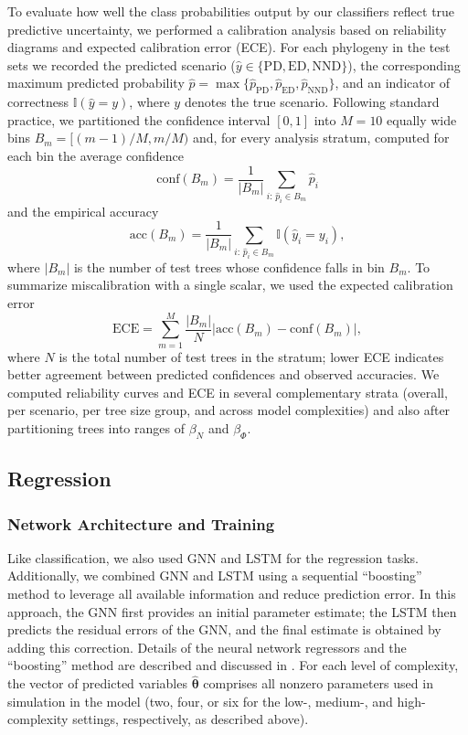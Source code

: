 {To evaluate how well the class probabilities output by our classifiers reflect true predictive uncertainty, we performed a calibration analysis based on reliability diagrams and expected calibration error (ECE). For each phylogeny in the test sets we recorded the predicted scenario (\(\widehat{y}\in\{\mathrm{PD}, \mathrm{ED}, \mathrm{NND}\}\)), the corresponding maximum predicted probability \(\hat{p}=\max\{\hat{p}_{\mathrm{PD}},\hat{p}_{\mathrm{ED}},\hat{p}_{\mathrm{NND}}\}\), and an indicator of correctness \(\mathbb{I}(\widehat{y}=y)\), where \(y\) denotes the true scenario. Following standard practice, we partitioned the confidence interval \([0,1]\) into \(M=10\) equally wide bins \(B_m=[(m-1)/M,m/M)\) and, for every analysis stratum, computed for each bin the average confidence
\begin{equation}
\mathrm{conf}(B_m) = \frac{1}{|B_m|} \sum_{i:\,\hat{p}_i\in B_m} \hat{p}_i
\end{equation}
and the empirical accuracy
\begin{equation}
\mathrm{acc}(B_m) = \frac{1}{|B_m|} \sum_{i:\,\hat{p}_i\in B_m} \mathbb{I}(\widehat{y}_i = y_i),
\end{equation}
where \(|B_m|\) is the number of test trees whose confidence falls in bin \(B_m\). To summarize miscalibration with a single scalar, we used the expected calibration error
\begin{equation}
\mathrm{ECE} = \sum_{m=1}^{M} \frac{|B_m|}{N} \bigl|\mathrm{acc}(B_m)-\mathrm{conf}(B_m)\bigr|,
\end{equation}
where \(N\) is the total number of test trees in the stratum; lower ECE indicates better agreement between predicted confidences and observed accuracies. We computed reliability curves and ECE in several complementary strata (overall, per scenario, per tree size group, and across model complexities) and also after partitioning trees into ranges of \(\beta_N\) and \(\beta_{\varPhi}\). 

\subsection{Regression}
\label{ch3::sec::methods::regression}
\subsubsection{Network Architecture and Training}
\label{ch3::sec::methods::regression::architecture}
Like classification, we also used GNN and LSTM for the regression tasks. Additionally, we combined GNN and LSTM using a sequential ``boosting'' method to leverage all available information and reduce prediction error. In this approach, the GNN first provides an initial parameter estimate; the LSTM then predicts the residual errors of the GNN, and the final estimate is obtained by adding this correction. Details of the neural network regressors and the ``boosting'' method are described and discussed in \citet{qin_parameter_2025}. For each level of complexity, the vector of predicted variables \(\boldsymbol{\hat{\theta}}\) comprises all nonzero parameters used in simulation in the model (two, four, or six for the low-, medium-, and high-complexity settings, respectively, as described above).

}
